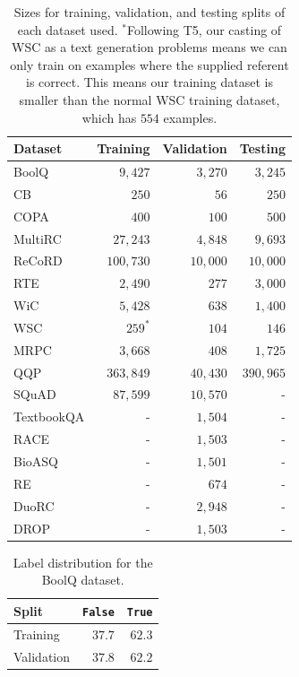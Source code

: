 \documentclass[11pt]{article}
\begin{document}
\begin{table}[t]
    \centering
    \footnotesize
    \begin{tabular}{l| r r r}
        \toprule
        Dataset    & Training    & Validation & Testing     \\
        \midrule
        BoolQ      & $9{,}427$   & $3{,}270$  & $3{,}245$   \\
        CB         & $250$       & $56$       & $250$       \\
        COPA       & $400$       & $100$      & $500$       \\
        MultiRC    & $27{,}243$  & $4{,}848$  & $9{,}693$   \\
        ReCoRD     & $100{,}730$ & $10{,}000$ & $10{,}000$  \\
        RTE        & $2{,}490$   & $277$      & $3{,}000 $  \\
        WiC        & $5{,}428$   & $638$      & $1{,}400$   \\
        WSC        & $259^*$     & $104$      & $146$       \\
        MRPC       & $3{,}668$   & $408$      & $1{,}725$   \\
        QQP        & $363{,}849$ & $40{,}430$ & $390{,}965$ \\
        SQuAD      & $87{,}599$  & $10{,}570$ &           - \\
        TextbookQA &           - & $1{,}504$  &           - \\
        RACE       &           - & $1{,}503$  &           - \\
        BioASQ     &           - & $1{,}501$  &           - \\
        RE         &           - & $674$      &           - \\
        DuoRC      &           - & $2{,}948$  &           - \\
        DROP       &           - & $1{,}503$  &           - \\
        \bottomrule
    \end{tabular}
    \caption{Sizes for training, validation, and testing splits of each dataset used. $^*$Following T5, our casting of WSC as a text generation problems means we can only train on examples where the supplied referent is correct. This means our training dataset is smaller than the normal WSC training dataset, which has $554$ examples.}
    \label{tab:dataset-size}
\end{table}

\begin{table}[t]
    \centering
    \footnotesize
    \begin{tabular}{l|r r}
    \toprule
    Split & {\tt False} & {\tt True} \\
    \midrule
    Training & $37.7$ & $62.3$ \\
    Validation & $37.8$ & $62.2$ \\
    \bottomrule
    \end{tabular}
    \caption{Label distribution for the BoolQ dataset.}
    \label{tab:boolq-label-dist}
\end{table}
\end{document}
